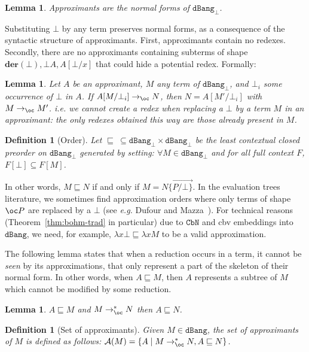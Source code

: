 \documentclass[10pt,a4paper]{article}
\newtheorem{lemma}[theorem]{Lemma}
\newtheorem{definition}[theorem]{Definition}
\newcommand{\<}{\langle}
\renewcommand{\>}{\rangle}
\newcommand{\set}[1]{\ensuremath{\{#1\}}}
\newcommand{\der}[1]{\ensuremath{\mathbf{der}(#1)}}
\newcommand{\cbn}{\ensuremath{\mathtt{CbN}}}
\newcommand{\dbang}{\ensuremath{\mathtt{dBang}}}
\newcommand{\dbangb}{\ensuremath{\dbang_\bot}}
\newcommand{\todbf}{\to_{\oc}} %
\newcommand{\es}[2]{[#1/#2]}
\newcommand{\mcal}[1]{\ensuremath{\mathcal{#1}}}
\newcommand{\setApprox}{\mcal{A}}
\newcommand{\smaller}{\ensuremath{\sqsubseteq}}
\begin{document}
\begin{lemma}
	Approximants are the normal forms of $\dbangb$. 
\end{lemma}
Substituting $\bot$ by any term preserves normal forms, as a consequence of the syntactic structure of
approximants. First, approximants contain no redexes. Secondly, 
there are no approximants containing
subterms of shape $\der \bot, \bot A, A\es\bot x$ that could hide a
potential redex. Formally:
\begin{lemma}
	\label{lem:approx_bot}
	Let $A$ be an approximant, $M$ any term of $\dbangb$, and $\bot_i$ some
	occurrence of $\bot$ in $A$. If	$A[M/\bot_i]\todbf N$, then
	$N=A[M'/\bot_i]$ with $M\todbf M'$. \emph{i.e.} we cannot create a redex
	when replacing a $\bot$ by a term $M$ in an approximant: the only redexes
	obtained this way are those already present in $M$.
\end{lemma}

\begin{definition}[Order]
Let $\smaller\ \subseteq \dbangb\times \dbangb$ be the least contextual closed
	preorder on $\dbangb$ generated by setting: 
 $\forall M\in \dbangb$ and for all full context $F$, $F[\bot] \subseteq F[M]$. 
\end{definition}
In other words, $M\smaller N$ if and only if $M=N\overrightarrow{\{P/\bot\}}$. In
the evaluation trees literature, we sometimes find approximation orders where only
terms of shape $\oc P$ are replaced by a $\bot$ (see \emph{e.g.} Dufour and
Mazza~\cite{mazza-dufour}). For technical reasons (Theorem~\ref{thm:bohm-trad} in
particular) due to \cbn{} and
cbv{} embeddings into $\dbang$, we need, for example, $\lambda
x\bot\smaller\lambda xM$ to be a valid approximation.

The following lemma states that when a reduction occurs in a term,
it cannot be \emph{seen} by its approximations, that only represent a part of
the skeleton of their normal form. In other words, when $A\smaller M$, then
$A$ represents a subtree of $M$ which cannot be modified by some reduction.

\begin{lemma}
	\label{lem:bang:bohm:reduce-have-at-least-same-approxs}
	$A\smaller M$ and $M \todbf^* N$ then $A\smaller N$.
\end{lemma}

\begin{definition}[Set of approximants]
\label{def:bang:bohm:approx-set}
Given $M \in \dbang$, the set of approximants of $M$ is defined as follows:
$\setApprox(M) = \set{A \mid M \todbf^* N, A \smaller N}$.
\end{definition}
\end{document}
